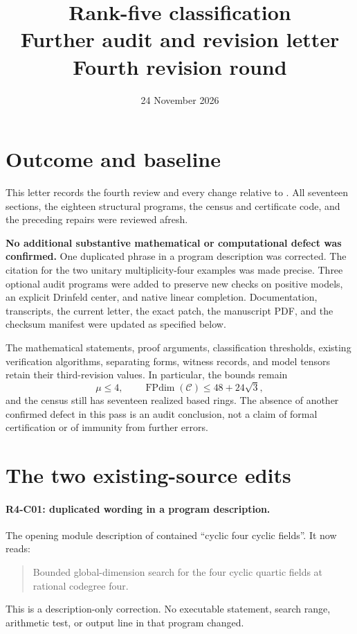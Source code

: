 \documentclass[11pt,a4paper]{article}
\title{Rank-five classification\\[4pt]\large Further audit and revision letter\\Fourth revision round}
\author{}
\date{24 November 2026}
\begin{document}
\maketitle

\section{Outcome and baseline}

This letter records the fourth review and every change relative to
. All seventeen sections,
the eighteen structural programs, the census and certificate code,
and the preceding repairs were reviewed afresh.

\textbf{No additional substantive mathematical or computational defect
was confirmed.} One duplicated phrase in a program description was
corrected. The citation for the two unitary multiplicity-four examples
was made precise. Three optional audit programs were added to preserve
new checks on positive models, an explicit Drinfeld center, and native
linear completion. Documentation, transcripts, the current letter,
the exact patch, the manuscript PDF, and the checksum manifest were
updated as specified below.

The mathematical statements, proof arguments, classification thresholds,
existing verification algorithms, separating forms, witness records,
and model tensors retain their third-revision values. In particular,
the bounds remain
\[
 \mu\le4,\qquad \operatorname{FPdim}(\mathcal C)\le48+24\sqrt3,
\]
and the census still has seventeen realized based rings. The absence
of another confirmed defect in this pass is an audit conclusion, not
a claim of formal certification or of immunity from further errors.

\section{The two existing-source edits}

\paragraph{R4-C01: duplicated wording in a program description.}
The opening module description of 
contained ``cyclic four cyclic fields''. It now reads:
\begin{quote}
Bounded global-dimension search for the four cyclic quartic fields
at rational codegree four.
\end{quote}
This is a description-only correction. No executable statement,
search range, arithmetic test, or output line in that program changed.
\end{document}
